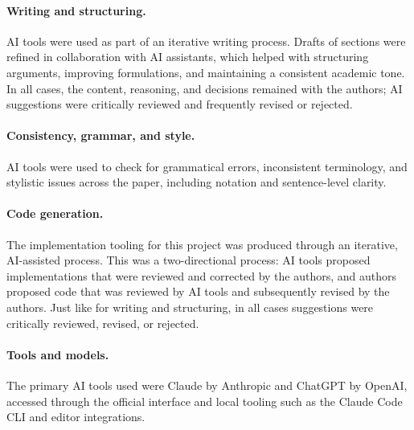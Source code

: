 \documentclass[a4paper, 12pt]{article}
\begin{document}
\paragraph{Writing and structuring.}
AI tools were used as part of an iterative writing process.
Drafts of sections were refined in collaboration with AI assistants, which helped with structuring arguments, improving formulations, and maintaining a consistent academic tone.
In all cases, the content, reasoning, and decisions remained with the authors; AI suggestions were critically reviewed and frequently revised or rejected.

\paragraph{Consistency, grammar, and style.}
AI tools were used to check for grammatical errors, inconsistent terminology, and stylistic issues across the paper, including notation and sentence-level clarity.

\paragraph{Code generation.}
The implementation tooling for this project was produced through an iterative, AI-assisted process.
This was a two-directional process: AI tools proposed implementations that were reviewed and corrected by the authors, and authors proposed code that was reviewed by AI tools and subsequently revised by the authors. Just like for writing and structuring, in all cases suggestions were critically reviewed, revised, or rejected.

\paragraph{Tools and models.}
The primary AI tools used were Claude by Anthropic and ChatGPT by OpenAI, accessed through the official interface and local tooling such as the Claude Code CLI and editor integrations.
\end{document}
